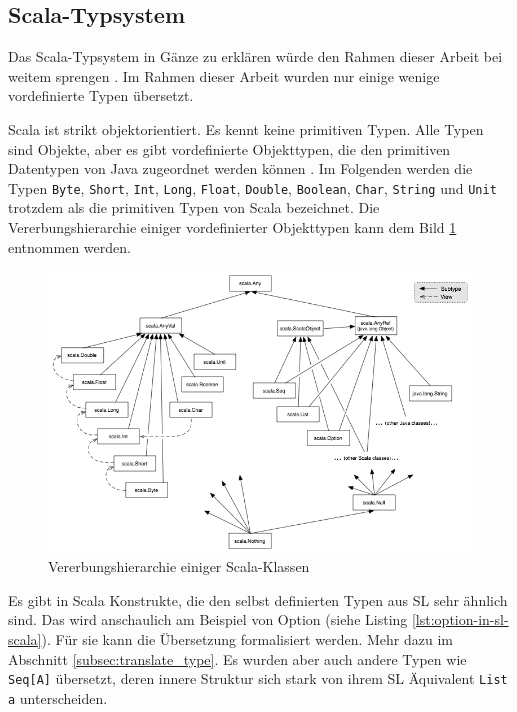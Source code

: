 \documentclass[12pt,bibtotoc]{scrreprt}
\begin{document}
\subsection{Scala-Typsystem}

Das Scala-Typsystem in Gänze zu erklären würde den Rahmen dieser Arbeit bei weitem sprengen \cite{Odersky2013}. Im Rahmen dieser Arbeit wurden nur einige wenige vordefinierte Typen übersetzt.

Scala ist strikt objektorientiert. Es kennt keine primitiven Typen. Alle Typen sind Objekte, aber es gibt vordefinierte Objekttypen, die den primitiven Datentypen von Java zugeordnet werden können \cite{Paggen2013}. Im Folgenden werden die Typen \lstinline!Byte!, \lstinline!Short!, \lstinline!Int!, \lstinline!Long!, \lstinline!Float!, \lstinline!Double!, \lstinline!Boolean!, \lstinline!Char!, \lstinline!String! und \lstinline!Unit! trotzdem als die primitiven Typen von Scala bezeichnet. Die Vererbungshierarchie einiger vordefinierter Objekttypen kann dem Bild \ref{fig:classhierarchy} entnommen werden.

\begin{figure}[h] 
  \centering
     \includegraphics[width=\textwidth]{Bilder/classhierarchy}
  \caption{Vererbungshierarchie einiger Scala-Klassen \cite{UnbekannterAutor2013}}
  \label{fig:classhierarchy}
\end{figure}

Es gibt in Scala Konstrukte, die den selbst definierten Typen aus \ac{SL} sehr ähnlich sind. Das wird anschaulich am Beispiel von Option (siehe Listing \ref{lst:option-in-sl-scala}). Für sie kann die Übersetzung formalisiert werden. Mehr dazu im Abschnitt \ref{subsec:translate_type}. Es wurden aber auch andere Typen wie \lstinline!Seq[A]! übersetzt, deren innere Struktur sich stark von ihrem SL Äquivalent \lstinline!List a! unterscheiden.
\end{document}
